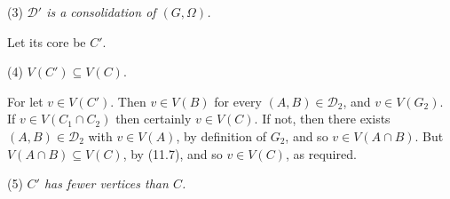 \hspace*{12pt}(3) \textit{$\mathcal{D}'$ is a consolidation of $(G, \Omega)$.}

Let its core be $C'$.

\hspace*{12pt}(4) $V(C') \subseteq V(C)$.

For let $v \in V(C')$. Then $v \in V(B)$ for every $(A, B) \in \mathcal{D}_2$, and $v \in V(G_2)$. If $v \in V(C_1 \cap C_2)$ then certainly $v \in V(C)$. If not, then there exists $(A, B) \in \mathcal{D}_2$ with $v \in V(A)$, by definition of $G_2$, and so $v \in V(A \cap B)$. But $V(A \cap B) \subseteq V(C)$, by (11.7), and so $v \in V(C)$, as required.

\hspace*{12pt}(5) \textit{$C'$ has fewer vertices than $C$.}
